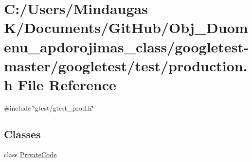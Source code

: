 \hypertarget{googletest-master_2googletest_2test_2production_8h}{}\section{C\+:/\+Users/\+Mindaugas K/\+Documents/\+Git\+Hub/\+Obj\+\_\+\+Duomenu\+\_\+apdorojimas\+\_\+class/googletest-\/master/googletest/test/production.h File Reference}
\label{googletest-master_2googletest_2test_2production_8h}
{\ttfamily \#include \char`\"{}gtest/gtest\+\_\+prod.\+h\char`\"{}}\newline
\subsection*{Classes}
\begin{DoxyCompactItemize}
\item 
class \mbox{\hyperlink{class_private_code}{Private\+Code}}
\end{DoxyCompactItemize}
